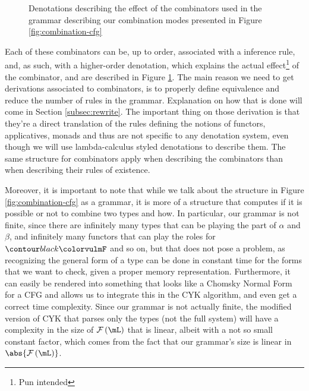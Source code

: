 \begin{figure}
	\centering
	
	\caption{Denotations describing the effect of the combinators used in the
		grammar describing our combination modes presented in
		Figure \ref{fig:combination-cfg}}
	\label{fig:combinator-denotations}
\end{figure}

Each of these combinators can be, up to order, associated with a inference
rule, and, as such, with a higher-order denotation, which explains the actual
effect\footnote{Pun intended} of the combinator, and are described in
Figure \ref{fig:combinator-denotations}.
The main reason we need to get derivations associated to combinators, is to
properly define equivalence and reduce the number of rules in the grammar.
Explanation on how that is done will come in Section \ref{subsec:rewrite}.
The important thing on those derivation is that they're a direct translation
of the rules defining the notions of functors, applicatives, monads and thus
are not specific to any denotation system, even though we will use
lambda-calculus styled denotations to describe them.
The same structure for combinators apply when describing the combinators
than when describing their rules of existence.

\medskip

Moreover, it is important to note that while we talk about the structure in
Figure \ref{fig:combination-cfg} as a grammar, it is more of a structure that
computes if it is possible or not to combine two types and how.
In particular, our grammar is not finite, since there are infinitely many types
that can be playing the part of $\alpha$ and $\beta$, and infinitely many
functors that can play the roles for $\f{F}$ and so on, but that does not pose
a problem, as recognizing the general form of a type can be done in constant
time for the forms that we want to check, given a proper memory representation.
Furthermore, it can easily be rendered into something that looks like a
Chomsky Normal Form for a CFG and allows us to integrate this in the CYK
algorithm, and even get a correct time complexity.
Since our grammar is not actually finite, the modified version of CYK that
parses only the types (not the full system) will have a complexity in the
size of $\mFunc\left(\mL\right)$ that is linear, albeit with a not so
small constant factor, which comes from the fact that our grammar's size is
linear in $\abs{\mFunc\left(\mL\right)}$.

